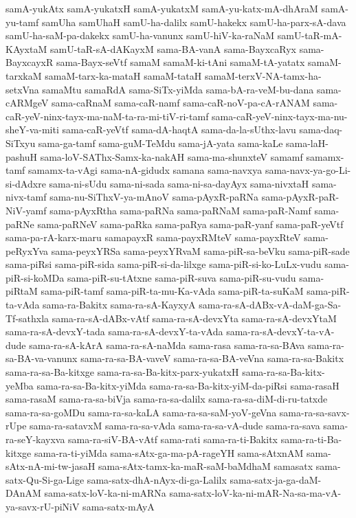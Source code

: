 {samA-yukAtx
samA-yukatxH
samA-yukatxM
samA-yu-katx-mA-dhAraM
samA-yu-tamf
samUha
samUhaH
samU-ha-dalilx
samU-hakekx
samU-ha-parx-sA-dava
samU-ha-saM-pa-dakekx
samU-ha-vanunx
samU-hiV-ka-raNaM
samU-taR-mA-KAyxtaM
samU-taR-sA-dAKayxM
sama-BA-vanA
sama-BayxcaRyx
sama-BayxcayxR
sama-Bayx-seVtf
samaM
samaM-ki-tAni
samaM-tA-yatatx
samaM-tarxkaM
samaM-tarx-ka-mataH
samaM-tataH
samaM-terxV-NA-tamx-ha-setxVna
samaMtu
samaRdA
sama-SiTx-yiMda
sama-bA-ra-veM-bu-dana
sama-cARMgeV
sama-caRnaM
sama-caR-namf
sama-caR-noV-pa-cA-rANAM
sama-caR-yeV-ninx-tayx-ma-naM-ta-ra-mi-tiV-ri-tamf
sama-caR-yeV-ninx-tayx-ma-nu-sheY-va-miti
sama-caR-yeVtf
sama-dA-haqtA
sama-da-la-sUthx-lavu
sama-daq-SiTxyu
sama-ga-tamf
sama-guM-TeMdu
sama-jA-yata
sama-kaLe
sama-laH-pashuH
sama-loV-SAThx-Samx-ka-nakAH
sama-ma-shunxteV
samamf
samamx-tamf
samamx-ta-vAgi
sama-nA-gidudx
samana
sama-navxya
sama-navx-ya-go-Li-si-dAdxre
sama-ni-sUdu
sama-ni-sada
sama-ni-sa-dayAyx
sama-nivxtaH
sama-nivx-tamf
sama-nu-SiThxV-ya-mAnoV
sama-pAyxR-paRNa
sama-pAyxR-paR-NiV-yamf
sama-pAyxRtha
sama-paRNa
sama-paRNaM
sama-paR-Namf
sama-paRNe
sama-paRNeV
sama-paRka
sama-paRya
sama-paR-yanf
sama-paR-yeVtf
sama-pa-rA-karx-maru
samapayxR
sama-payxRMteV
sama-payxRteV
sama-peRyxYva
sama-peyxYRSa
sama-peyxYRvaM
sama-piR-sa-beVku
sama-piR-sade
sama-piRsi
sama-piR-sida
sama-piR-si-da-lilxge
sama-piR-si-ko-LuLx-vudu
sama-piR-si-koMDa
sama-piR-su-tAtxne
sama-piR-suva
sama-piR-su-vudu
sama-piRtaM
sama-piR-tamf
sama-piR-ta-mu-Ka-vAda
sama-piR-ta-suKaM
sama-piR-ta-vAda
sama-ra-Bakitx
sama-ra-sA-KayxyA
sama-ra-sA-dABx-vA-daM-ga-Sa-Tf-sathxla
sama-ra-sA-dABx-vAtf
sama-ra-sA-devxYta
sama-ra-sA-devxYtaM
sama-ra-sA-devxY-tada
sama-ra-sA-devxY-ta-vAda
sama-ra-sA-devxY-ta-vA-dude
sama-ra-sA-kArA
sama-ra-sA-naMda
sama-rasa
sama-ra-sa-BAva
sama-ra-sa-BA-va-vanunx
sama-ra-sa-BA-vaveV
sama-ra-sa-BA-veVna
sama-ra-sa-Bakitx
sama-ra-sa-Ba-kitxge
sama-ra-sa-Ba-kitx-parx-yukatxH
sama-ra-sa-Ba-kitx-yeMba
sama-ra-sa-Ba-kitx-yiMda
sama-ra-sa-Ba-kitx-yiM-da-piRsi
sama-rasaH
sama-rasaM
sama-ra-sa-biVja
sama-ra-sa-dalilx
sama-ra-sa-diM-di-ru-tatxde
sama-ra-sa-goMDu
sama-ra-sa-kaLA
sama-ra-sa-saM-yoV-geVna
sama-ra-sa-savx-rUpe
sama-ra-satavxM
sama-ra-sa-vAda
sama-ra-sa-vA-dude
sama-ra-sava
sama-ra-seY-kayxva
sama-ra-siV-BA-vAtf
sama-rati
sama-ra-ti-Bakitx
sama-ra-ti-Ba-kitxge
sama-ra-ti-yiMda
sama-sAtx-ga-ma-pA-rageYH
sama-sAtxnAM
sama-sAtx-nA-mi-tw-jasaH
sama-sAtx-tamx-ka-maR-saM-baMdhaM
samasatx
sama-satx-Qu-Si-ga-Lige
sama-satx-dhA-nAyx-di-ga-Lalilx
sama-satx-ja-ga-daM-DAnAM
sama-satx-loV-ka-ni-mARNa
sama-satx-loV-ka-ni-mAR-Na-sa-ma-vA-ya-savx-rU-piNiV
sama-satx-mAyA
}

